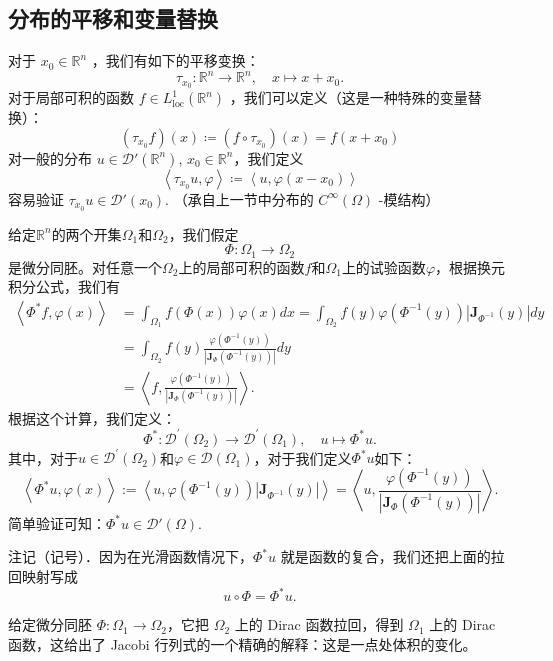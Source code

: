 \subsection{分布的平移和变量替换}

对于 $x_0 \in \mathbb{R}^n$ ，我们有如下的平移变换：
\[
\tau_{x_0}: \mathbb{R}^n \rightarrow \mathbb{R}^n, \quad x \mapsto x+x_0 .
\]
对于局部可积的函数 $f \in L_{\mathrm{loc}}^1\left(\mathbb{R}^n\right)$ ，我们可以定义（这是一种特殊的变量替换）：
\[
(\tau_{x_0}f)(x)\coloneqq (f\circ \tau_{x_0})(x)=f(x+x_0)
\]
对一般的分布 $u\in \mathcal{D}'(\mathbb{R}^{n})$, $x_0\in \mathbb{R}^{n}$，我们定义
\[
\left< \tau_{x_0}u,\varphi \right> \coloneqq  \left< u,\varphi(x-x_0) \right>
\]
容易验证 $\tau_{x_0}u\in \mathcal{D}'(x_0)$. （承自上一节中分布的 $C^{\infty}(\Omega)$ -模结构）

给定$\mathbb{R}^n$的两个开集$\Omega_1$和$\Omega_2$，我们假定
\[
\Phi: \Omega_1 \rightarrow \Omega_2
\]
是微分同胚。对任意一个$\Omega_2$上的局部可积的函数$f$和$\Omega_1$上的试验函数$\varphi$，根据换元积分公式，我们有
\[
\begin{aligned}
\left\langle\Phi^* f, \varphi(x)\right\rangle & =\int_{\Omega_1} f(\Phi(x)) \varphi(x) d x=\int_{\Omega_2} f(y) \varphi\left(\Phi^{-1}(y)\right)\left|\mathbf{J}_{\Phi^{-1}}(y)\right| d y \\
& =\int_{\Omega_2} f(y) \frac{\varphi\left(\Phi^{-1}(y)\right)}{\left|\mathbf{J}_{\Phi}\left(\Phi^{-1}(y)\right)\right|} d y \\
& =\left\langle f, \frac{\varphi\left(\Phi^{-1}(y)\right)}{\left|\mathbf{J}_{\Phi}\left(\Phi^{-1}(y)\right)\right|}\right\rangle .
\end{aligned}
\]
根据这个计算，我们定义：
\[
\Phi^*: \mathcal{D}^{\prime}\left(\Omega_2\right) \rightarrow \mathcal{D}^{\prime}\left(\Omega_1\right), \quad u \mapsto \Phi^* u .
\]
其中，对于$u \in \mathcal{D}^{\prime}\left(\Omega_2\right)$和$\varphi \in \mathcal{D}\left(\Omega_1\right)$，对于我们定义$\Phi^* u$如下：
\[
\left\langle\Phi^* u, \varphi(x)\right\rangle:=\left\langle u, \varphi\left(\Phi^{-1}(y)\right)\left|\mathbf{J}_{\Phi^{-1}}(y)\right|\right\rangle=\left\langle u, \frac{\varphi\left(\Phi^{-1}(y)\right)}{\left|\mathbf{J}_{\Phi}\left(\Phi^{-1}(y)\right)\right|}\right\rangle .
\]
简单验证可知：$\Phi^{*}u\in \mathcal{D}'(\Omega)$.

\begin{remark}
注记（记号）．因为在光滑函数情况下，$\Phi^* u$ 就是函数的复合，我们还把上面的拉回映射写成
\[
u \circ \Phi=\Phi^* u .
\]
\end{remark}
给定微分同胚 $\Phi: \Omega_1 \rightarrow \Omega_2$，它把 $\Omega_2$ 上的 Dirac 函数拉回，得到 $\Omega_1$ 上的 Dirac 函数，这给出了 Jacobi 行列式的一个精确的解释：这是一点处体积的变化。

